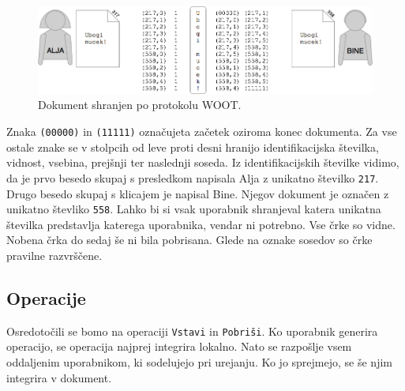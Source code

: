 \documentclass[a4paper, 12pt, twoside]{book}
\begin{document}
\begin{figure}[placement h]
\begin{center}
\includegraphics[width=13cm]{woot2.png}
\end{center}
\caption{Dokument shranjen po protokolu WOOT.}
\label{woot2}
\end{figure}

Znaka {\tt (00000)} in {\tt (11111)} označujeta začetek oziroma konec dokumenta. Za vse ostale znake se v stolpcih od leve proti desni hranijo identifikacijska številka, vidnost, vsebina, prejšnji ter naslednji soseda. Iz identifikacijskih številke vidimo, da je prvo besedo skupaj s presledkom napisala Alja z unikatno številko {\tt 217}. Drugo besedo skupaj s klicajem je napisal Bine. Njegov dokument je označen z unikatno števliko {\tt 558}. Lahko bi si vsak uporabnik shranjeval katera unikatna številka predstavlja katerega uporabnika, vendar ni potrebno. Vse črke so vidne. Nobena črka do sedaj še ni bila pobrisana. Glede na oznake sosedov so črke pravilne razvrščene.

\subsection{Operacije}

Osredotočili se bomo na operaciji {\tt Vstavi} in {\tt Pobriši}. Ko uporabnik generira operacijo, se operacija najprej integrira lokalno. Nato se razpošlje vsem oddaljenim uporabnikom, ki sodelujejo pri urejanju. Ko jo sprejmejo, se še njim integrira v dokument.
\end{document}

